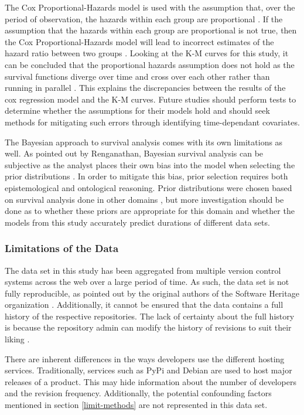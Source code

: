 \documentclass[acmconf]{acmart}
\begin{document}
The Cox Proportional-Hazards model is used with the assumption that, over the period of observation, the hazards within each group are proportional \cite{stel2011cox}.
If the assumption that the hazards within each group are proportional is not true, then the Cox Proportional-Hazards model will lead to incorrect estimates of the hazard ratio between two groups \cite{stel2011cox}.
Looking at the K-M curves for this study, it can be concluded that the proportional hazards assumption does not hold as the survival functions diverge over time and cross over each other rather than running in parallel \cite{persson2007ACO}.
This explains the discrepancies between the results of the cox regression model and the K-M curves.
Future studies should perform tests to determine whether the assumptions for their models hold and should seek methods for mitigating such errors through identifying time-dependant covariates.

The Bayesian approach to survival analysis comes with its own limitations as well.
As pointed out by Renganathan, Bayesian survival analysis can be subjective as the analyst places their own bias into the model when selecting the prior distributions \cite{renganathan2016overview}.
In order to mitigate this bias, prior selection requires both epistemological and ontological reasoning.
Prior distributions were chosen based on survival analysis done in other domains \cite{kelter2020bayesian, rethinking}, but more investigation should be done as to whether these priors are appropriate for this domain and whether the models from this study accurately predict durations of different data sets.

\subsubsection{Limitations of the Data}

The data set in this study has been aggregated from multiple version control systems across the web over a large period of time.
As such, the data set is not fully reproducible, as pointed out by the original authors of the Software Heritage organization \cite{pietri2019software}.
Additionally, it cannot be ensured that the data contains a full history of the respective repositories.
The lack of certainty about the full history is because the repository admin can modify the history of revisions to suit their liking \cite{perils2009}.

There are inherent differences in the ways developers use the different hosting services.
Traditionally, services such as PyPi and Debian are used to host major releases of a product.
This may hide information about the number of developers and the revision frequency.
Additionally, the potential confounding factors mentioned in section \ref{limit-methods} are not represented in this data set.
\end{document}
